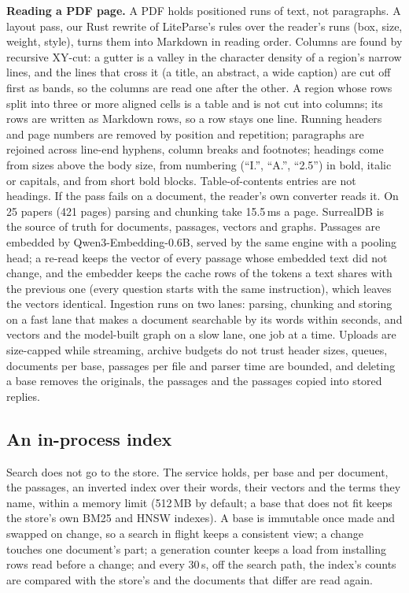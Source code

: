 \textbf{Reading a PDF page.} A PDF holds positioned runs of text, not
paragraphs. A layout pass, our Rust rewrite of LiteParse's rules
\cite{liteparse2026} over the reader's runs (box, size, weight, style), turns
them into Markdown in reading order. Columns are found by recursive XY-cut: a
gutter is a valley in the character density of a region's narrow lines, and
the lines that cross it (a title, an abstract, a wide caption) are cut off
first as bands, so the columns are read one after the other. A region whose
rows split into three or more aligned cells is a table and is not cut into
columns; its rows are written as Markdown rows, so a row stays one line.
Running headers and page numbers are removed by position and repetition;
paragraphs are rejoined across line-end hyphens, column breaks and footnotes;
headings come from sizes above the body size, from numbering (``I.'',
``A.'', ``2.5'') in bold, italic or capitals, and from short bold blocks.
Table-of-contents entries are not headings. If the pass fails on a document,
the reader's own converter reads it. On 25 papers (421 pages) parsing and
chunking take 15.5\,ms a page. SurrealDB is the source of
truth for documents, passages, vectors and graphs. Passages are embedded by
Qwen3-Embedding-0.6B, served by the same engine with a pooling head; a
re-read keeps the vector of every passage whose embedded text did not change,
and the embedder keeps the cache rows of the tokens a text shares with the
previous one (every question starts with the same instruction), which leaves
the vectors identical. Ingestion runs on two lanes: parsing, chunking and
storing on a fast lane that makes a document searchable by its words within
seconds, and vectors and the model-built graph on a slow lane, one job at a
time. Uploads are size-capped while streaming, archive budgets do not trust
header sizes, queues, documents per base, passages per file and parser time
are bounded, and deleting a base removes the originals, the passages and the
passages copied into stored replies.

\subsection{An in-process index}
\label{sec:kb:index}
Search does not go to the store. The service holds, per base and per
document, the passages, an inverted index over their words, their vectors and
the terms they name, within a memory limit (512\,MB by default; a base that
does not fit keeps the store's own BM25 and HNSW indexes). A base is
immutable once made and swapped on change, so a search in flight keeps a
consistent view; a change touches one document's part; a generation counter
keeps a load from installing rows read before a change; and every 30\,s, off
the search path, the index's counts are compared with the store's and the
documents that differ are read again.

